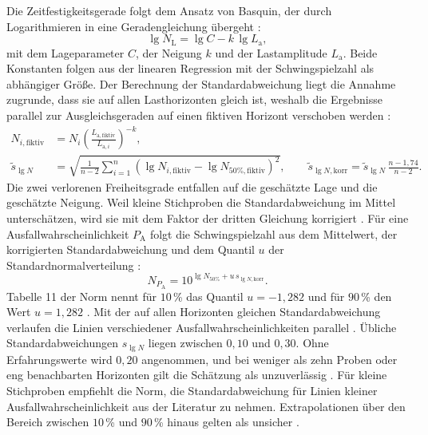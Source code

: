 Die Zeitfestigkeitsgerade folgt dem Ansatz von Basquin, der durch Logarithmieren in eine Geradengleichung übergeht \cite[Abschnitt~10.2.2, S.~55]{DIN50100}:
\begin{equation}
    \lg N_{\mathrm{L}} = \lg C - k \,\lg L_{\mathrm{a}} ,
    \label{eq:zeitfestigkeitsgerade}
\end{equation}
mit dem Lageparameter $C$, der Neigung $k$ und der Lastamplitude $L_{\mathrm{a}}$. Beide Konstanten folgen aus der linearen Regression mit der Schwingspielzahl als abhängiger Größe. Der Berechnung der Standardabweichung liegt die Annahme zugrunde, dass sie auf allen Lasthorizonten gleich ist, weshalb die Ergebnisse parallel zur Ausgleichsgeraden auf einen fiktiven Horizont verschoben werden \cite[S.~56]{DIN50100}:
\begin{equation}
    \begin{aligned}
        N_{i,\mathrm{fiktiv}} & = N_{i} \left(\frac{L_{\mathrm{a,fiktiv}}}{L_{\mathrm{a},i}}\right)^{-k} ,                                               \\
        \tilde{s}_{\lg N}     & = \sqrt{\frac{1}{n-2} \sum_{i=1}^{n} \left(\lg N_{i,\mathrm{fiktiv}} - \lg N_{50\%,\mathrm{fiktiv}}\right)^{2}} , \qquad
        \tilde{s}_{\lg N,\mathrm{korr}} = \tilde{s}_{\lg N} \, \frac{n - 1{,}74}{n - 2} .
    \end{aligned}
    \label{eq:perlenschnur_streuung}
\end{equation}
Die zwei verlorenen Freiheitsgrade entfallen auf die geschätzte Lage und die geschätzte Neigung. Weil kleine Stichproben die Standardabweichung im Mittel unterschätzen, wird sie mit dem Faktor der dritten Gleichung korrigiert \cite[S.~56 bis 57]{DIN50100}. Für eine Ausfallwahrscheinlichkeit $P_{\mathrm{A}}$ folgt die Schwingspielzahl aus dem Mittelwert, der korrigierten Standardabweichung und dem Quantil $u$ der Standardnormalverteilung \cite[Abschnitt~10.5, S.~63]{DIN50100}:
\begin{equation}
    N_{P_{\mathrm{A}}} = 10^{\lg N_{50\%} + u \, s_{\lg N,\mathrm{korr}}} .
    \label{eq:quantil}
\end{equation}
Tabelle 11 der Norm nennt für $10$\,\% das Quantil $u = -1{,}282$ und für $90$\,\% den Wert $u = 1{,}282$ \cite[Tabelle~11, S.~63]{DIN50100}. Mit der auf allen Horizonten gleichen Standardabweichung verlaufen die Linien verschiedener Ausfallwahrscheinlichkeiten parallel \cite[S.~63]{DIN50100}. Übliche Standardabweichungen $s_{\lg N}$ liegen zwischen $0{,}10$ und $0{,}30$. Ohne Erfahrungswerte wird $0{,}20$ angenommen, und bei weniger als zehn Proben oder eng benachbarten Horizonten gilt die Schätzung als unzuverlässig \cite[S.~30]{DIN50100}. Für kleine Stichproben empfiehlt die Norm, die Standardabweichung für Linien kleiner Ausfallwahrscheinlichkeit aus der Literatur zu nehmen. Extrapolationen über den Bereich zwischen $10$\,\% und $90$\,\% hinaus gelten als unsicher \cite[S.~29 und 63]{DIN50100}.

